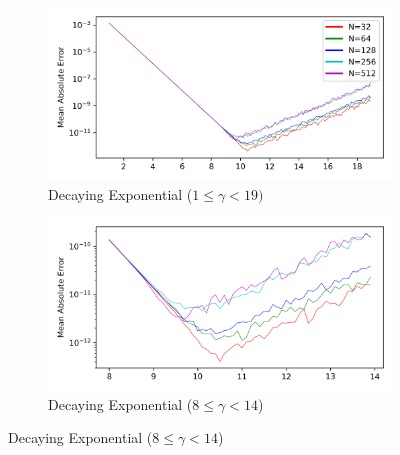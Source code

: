 \documentclass[a4paper]{report}
\begin{document}
\begin{figure}[H]
    \begin{subfigure}{.45\linewidth}
      \includegraphics[width=\linewidth]{images/cavers/decay_exp_2N.png}
      \caption{Decaying Exponential ($1 \leq \gamma < 19)$}
    \end{subfigure}\hfill
    \begin{subfigure}{.45\linewidth}
      \includegraphics[width=\linewidth]{images/cavers/decay_exp_zoomed_2N.png}
      \caption{Decaying Exponential ($8 \leq \gamma < 14$)}
    \end{subfigure}
    
    \medskip
\end{figure}
\end{document}
